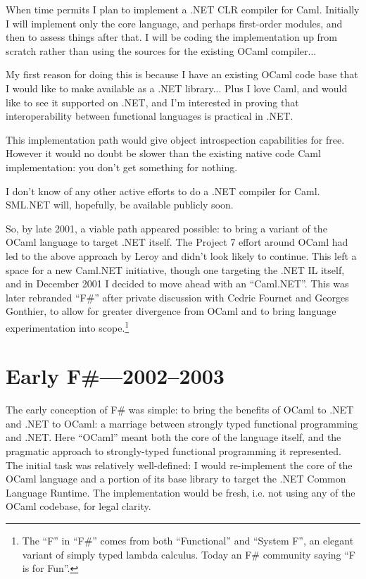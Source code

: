 \documentclass[acmsmall,screen]{acmart}
\begin{document}
\begin{verbquote}
When time permits I plan to implement a .NET CLR compiler for Caml. Initially I will implement only the core language, and perhaps first-order modules, and then to assess things after that.  I will be coding the implementation up from scratch rather than using the sources for the existing OCaml compiler...

My first reason for doing this is because I have an existing OCaml code base that I would like to make available as a .NET library...  Plus I love Caml, and would like to see it supported on .NET, and I'm interested in proving that interoperability between functional languages is practical in .NET. 

This implementation path would give object introspection capabilities for free.  However it would no doubt be slower than the existing native code Caml implementation: you don't get something for nothing.

I don't know of any other active efforts to do a .NET compiler for Caml.  SML.NET will, hopefully, be available publicly soon.
\end{verbquote}
So, by late 2001, a viable path appeared possible: to bring a variant of the OCaml language to target .NET itself. The Project 7 effort around OCaml
had led to the above approach by Leroy and didn’t look likely to continue.  This left a space for a new Caml.NET initiative, though one targeting
the .NET IL itself, and in December 2001 I decided to move ahead with an “Caml.NET”. This was later rebranded “F\#” after private discussion with
Cedric Fournet and Georges Gonthier, to allow for greater divergence from OCaml and to bring language experimentation into
scope.\footnote{The “F” in “F\#” comes from both “Functional” and “System F”, an elegant variant of simply typed lambda calculus. Today an F\# community saying “F is for Fun”.}


\section*{Early F\#---2002--2003}

The early conception of F\# was simple: to bring the benefits of OCaml to .NET and .NET to OCaml: a marriage between strongly typed functional
programming and .NET.  Here “OCaml” meant both the core of the language itself, and the pragmatic approach to strongly-typed functional programming
it represented. The initial task was relatively well-defined: I would re-implement the core of the OCaml language and a portion of its base
library to target the .NET Common Language Runtime. The implementation would be fresh, i.e. not using any of the OCaml codebase, for legal clarity. 
\end{document}
